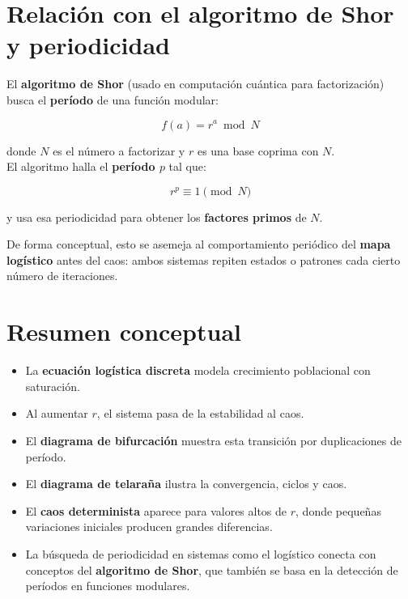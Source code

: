 \documentclass[
  letterpaper,
  DIV=11,
  numbers=noendperiod]{scrreprt}
\providecommand{\tightlist}{%
  \setlength{\itemsep}{0pt}\setlength{\parskip}{0pt}}
\begin{document}
\section{Relación con el algoritmo de Shor y
periodicidad}\label{relaciuxf3n-con-el-algoritmo-de-shor-y-periodicidad}

El \textbf{algoritmo de Shor} (usado en computación cuántica para
factorización) busca el \textbf{período} de una función modular:

\[
f(a) = r^a \bmod N
\]

donde \(N\) es el número a factorizar y \(r\) es una base coprima con
\(N\).\\
El algoritmo halla el \textbf{período \(p\)} tal que:

\[
r^{p} \equiv 1 \pmod{N}
\]

y usa esa periodicidad para obtener los \textbf{factores primos} de
\(N\).

De forma conceptual, esto se asemeja al comportamiento periódico del
\textbf{mapa logístico} antes del caos: ambos sistemas repiten estados o
patrones cada cierto número de iteraciones.

\section{Resumen conceptual}\label{resumen-conceptual}

\begin{itemize}
\tightlist
\item
  La \textbf{ecuación logística discreta} modela crecimiento poblacional
  con saturación.
\item
  Al aumentar \(r\), el sistema pasa de la estabilidad al caos.
\item
  El \textbf{diagrama de bifurcación} muestra esta transición por
  duplicaciones de período.
\item
  El \textbf{diagrama de telaraña} ilustra la convergencia, ciclos y
  caos.
\item
  El \textbf{caos determinista} aparece para valores altos de \(r\),
  donde pequeñas variaciones iniciales producen grandes diferencias.
\item
  La búsqueda de periodicidad en sistemas como el logístico conecta con
  conceptos del \textbf{algoritmo de Shor}, que también se basa en la
  detección de períodos en funciones modulares.
\end{itemize}

\end{document}
